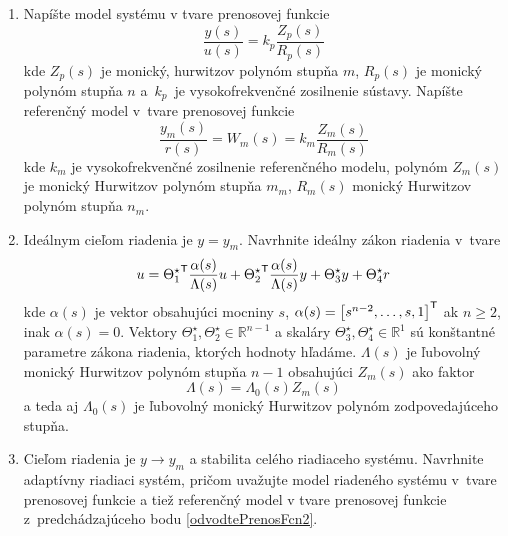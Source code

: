 \documentclass[a4paper, 10pt, ]{article}
\begin{document}
\begin{enumerate}[leftmargin=0pt, labelsep=4mm, itemsep=0pt]
	\begin{enumerate}[leftmargin=0pt, labelsep=4mm, itemsep=0pt]

		\item Napíšte model systému v tvare prenosovej funkcie \label{odvodtePrenosFcn2}
		\begin{equation*}
            \frac{y(s)}{u(s)} = k_p \frac{Z_p(s)}{R_p(s)}
		\end{equation*}
		kde $Z_p(s)$ je monický, hurwitzov polynóm stupňa $m$, $R_p(s)$ je monický polynóm stupňa $n$ a~$k_p$~je  vysokofrekvenčné zosilnenie sústavy. Napíšte referenčný model v~tvare prenosovej funkcie
		\begin{equation*}
			\frac{y_m(s)}{r(s)} = W_m(s) = k_m \frac{Z_m(s)}{R_m(s)}
		\end{equation*}
		kde $k_m$ je vysokofrekvenčné zosilnenie referenčného modelu, polynóm $Z_m(s)$ je monický Hurwitzov polynóm stupňa $m_m$, $R_m(s)$ monický Hurwitzov polynóm stupňa $n_m$.

		\item Ideálnym cieľom riadenia je $y = y_m$. Navrhnite ideálny zákon riadenia v~tvare
		\begin{equation*}
			u = {\Theta_1^\star}^{\mathsf{T}} \frac{\alpha(s)}{\Lambda(s)} u + {\Theta_2^\star}^{\mathsf{T}} \frac{\alpha(s)}{\Lambda(s)} y + \Theta_3^\star y + \Theta_4^\star r
		\end{equation*}
		kde $\alpha(s)$ je vektor obsahujúci mocniny $s$, $\alpha(s) = \begin{bmatrix} s^{n-2}, \ldots,s, 1 \end{bmatrix}^{\mathsf{T}}$ ak $n\geq 2$, inak $\alpha(s) = 0$. Vektory $\Theta_1^\star, \Theta_2^\star \in \mathbb{R}^{n-1}$ a  skaláry $\Theta_3^\star, \Theta_4^\star \in \mathbb{R}^1$ sú konštantné parametre zákona riadenia, ktorých hodnoty hľadáme.  $\Lambda(s)$ je ľubovolný monický Hurwitzov polynóm stupňa $n-1$ obsahujúci $Z_m(s)$ ako faktor
		\begin{equation*}
			\Lambda(s) = \Lambda_0(s) Z_m(s)
		\end{equation*}
		a teda aj $\Lambda_0(s)$ je ľubovolný monický Hurwitzov polynóm zodpovedajúceho stupňa.

		\item Cieľom riadenia je $y \to y_m$ a stabilita celého riadiaceho systému. Navrhnite adaptívny riadiaci systém, pričom uvažujte model riadeného systému v~tvare prenosovej funkcie  a tiež referenčný model v tvare prenosovej funkcie z~predchádzajúceho bodu \ref{odvodtePrenosFcn2}.

	\end{enumerate}






\end{enumerate}
\end{document}
